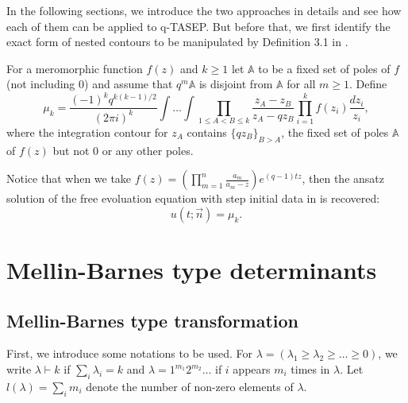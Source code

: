 In the following sections, we introduce the two approaches in details and see how each of them can be applied to q-TASEP. But before that, we first identify the exact form of nested contours to be manipulated by Definition 3.1 in \cite{macdonald2014}.

\begin{definition}
\label{mu_k_def}
For a meromorphic function $f(z)$ and $k \ge 1$ let $\mathbb{A}$ to be a fixed set of poles of $f$ (not including 0) and assume that $q^m \mathbb{A}$ is disjoint from $\mathbb{A}$ for all $m \ge 1$. Define
$$\mu_k = \frac{(-1)^k q^{k(k-1)/2}}{(2 \pi i)^k} \int \dots \int \prod_{1 \le A < B \le k} \frac{z_A - z_B} {z_A - qz_B} \prod_{i=1}^k f(z_i) \frac{dz_i}{z_i},$$ where the integration contour for $z_A$ contains $\{qz_B\}_{B > A}$, the fixed set of poles $\mathbb{A}$ of $f(z)$ but not $0$ or any other poles. 
\end{definition}

Notice that when we take $f(z) = \left( \prod_{m=1}^{n} \frac{a_m}{a_m - z} \right) e^{(q-1)tz}$, then the ansatz solution of the free evoluation equation with step initial data in  is recovered: $$u(t;\vec{n}) = \mu_k.$$

\section{Mellin-Barnes type determinants}

\subsection{Mellin-Barnes type transformation}
\label{m-b-type-transformation}
First, we introduce some notations to be used. For $\lambda = (\lambda_1 \ge \lambda_2 \ge \dots \ge 0)$, we write $\lambda \vdash k$ if $\sum_i \lambda_i = k$ and $\lambda = 1^{m_1} 2^{m_2} \dots$ if $i$ appears $m_i$ times in $\lambda$. Let $l(\lambda) = \sum_i m_i$ denote the number of non-zero elements of $\lambda$.\\

